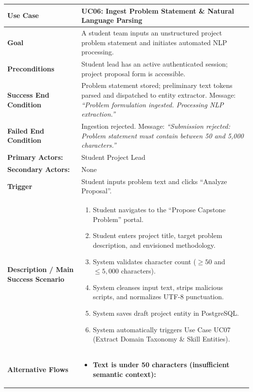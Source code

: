 \begin{table}[H]
\centering
\small
\begin{tabularx}{\textwidth}{|l|X|}
\hline
\rowcolor{lightgray!40} \textbf{Use Case} & \textbf{UC06: Ingest Problem Statement \& Natural Language Parsing} \\ \hline
\textbf{Goal} & A student team inputs an unstructured project problem statement and initiates automated NLP processing. \\ \hline
\textbf{Preconditions} & Student lead has an active authenticated session; project proposal form is accessible. \\ \hline
\textbf{Success End Condition} & Problem statement stored; preliminary text tokens parsed and dispatched to entity extractor. Message: \textit{``Problem formulation ingested. Processing NLP extraction.''} \\ \hline
\textbf{Failed End Condition} & Ingestion rejected. Message: \textit{``Submission rejected: Problem statement must contain between 50 and 5,000 characters.''} \\ \hline
\textbf{Primary Actors:} & Student Project Lead \\
\textbf{Secondary Actors:} & None \\ \hline
\textbf{Trigger} & Student inputs problem text and clicks ``Analyze Proposal''. \\ \hline
\textbf{Description / Main Success Scenario} &
\begin{enumerate}[leftmargin=*]
    \item Student navigates to the ``Propose Capstone Problem'' portal.
    \item Student enters project title, target problem description, and envisioned methodology.
    \item System validates character count ($\ge 50$ and $\le 5,000$ characters).
    \item System cleanses input text, strips malicious scripts, and normalizes UTF-8 punctuation.
    \item System saves draft project entity in PostgreSQL.
    \item System automatically triggers Use Case UC07 (Extract Domain Taxonomy \& Skill Entities).
\end{enumerate} \\ \hline
\textbf{Alternative Flows} &
\begin{itemize}[leftmargin=*]
    \item[\textbf{3.a.}] \textbf{Text is under 50 characters (insufficient semantic context):}

\end{itemize}
\end{tabularx}
\end{table}
